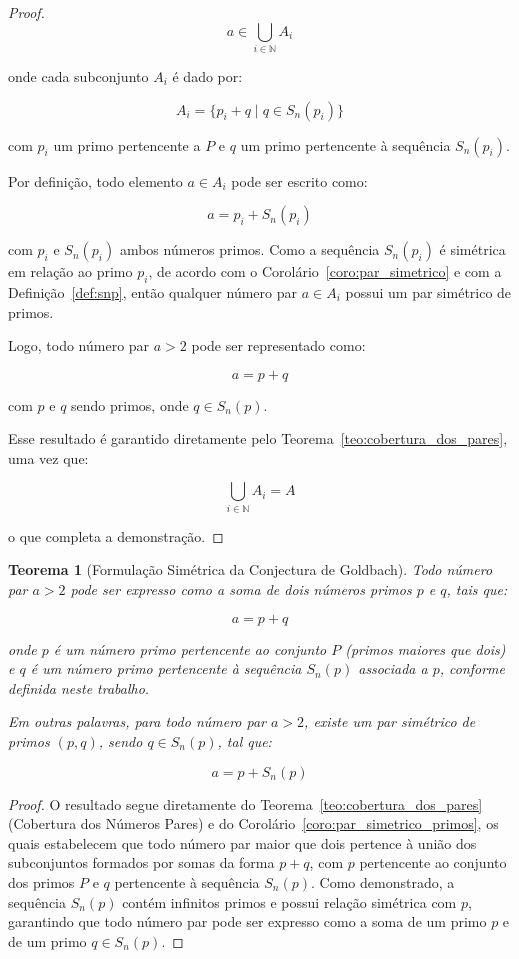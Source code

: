 \documentclass[a4paper,11pt]{article}
\newtheorem{theorem}{Teorema}[section]
\theoremstyle{definition}
\theoremstyle{remark}
\begin{document}
\begin{otherlanguage}{brazil}
\begin{proof}
		\[
		a \in \bigcup_{i \in \mathbb{N}} A_i
		\]
		
		onde cada subconjunto \(A_i\) é dado por:
		
		\[
		A_i = \{p_i + q \mid q \in S_n(p_i)\}
		\]
		
		com \(p_i\) um primo pertencente a \(P\) e \(q\) um primo pertencente à sequência \(S_n(p_i)\).
		
		Por definição, todo elemento \(a \in A_i\) pode ser escrito como:
		
		\[
		a = p_i + S_n(p_i)
		\]
		
		com \(p_i\) e \(S_n(p_i)\) ambos números primos. Como a sequência \(S_n(p_i)\) é simétrica em relação ao primo \(p_i\), de acordo com o Corolário~\ref{coro:par_simetrico} e com a Definição~\ref{def:snp}, então qualquer número par \(a \in A_i\) possui um par simétrico de primos.
		
		Logo, todo número par \(a > 2\) pode ser representado como:
		
		\[
		a = p + q
		\]
		
		com \(p\) e \(q\) sendo primos, onde \(q \in S_n(p)\).
		
		Esse resultado é garantido diretamente pelo Teorema~\ref{teo:cobertura_dos_pares}, uma vez que:
		
		\[
		\bigcup_{i \in \mathbb{N}} A_i = A
		\]
		
		o que completa a demonstração. 
	\end{proof}
	
	
	\begin{theorem}[Formulação Simétrica da Conjectura de Goldbach]\label{teo:goldbach_por_simetria_de_primos}
		Todo número par \(a > 2\) pode ser expresso como a soma de dois números primos \(p\) e \(q\), tais que:
		
		\[
		a = p + q
		\]
		
		onde \(p\) é um número primo pertencente ao conjunto \(P\) (primos maiores que dois) e \(q\) é um número primo pertencente à sequência \(S_n(p)\) associada a \(p\), conforme definida neste trabalho.
		
		Em outras palavras, para todo número par \(a > 2\), existe um par simétrico de primos \((p, q)\), sendo \(q \in S_n(p)\), tal que:
		
		\[
		a = p + S_n(p)
		\]
	\end{theorem}
	\begin{proof}
	O resultado segue diretamente do Teorema~\ref{teo:cobertura_dos_pares} (Cobertura dos Números Pares) e do Corolário~\ref{coro:par_simetrico_primos}, os quais estabelecem que todo número par maior que dois pertence à união dos subconjuntos formados por somas da forma \(p + q\), com \(p\) pertencente ao conjunto dos primos \(P\) e \(q\) pertencente à sequência \(S_n(p)\). Como demonstrado, a sequência \(S_n(p)\) contém infinitos primos e possui relação simétrica com \(p\), garantindo que todo número par pode ser expresso como a soma de um primo \(p\) e de um primo \(q \in S_n(p)\).
	

\end{proof}
\end{otherlanguage}
\end{document}
